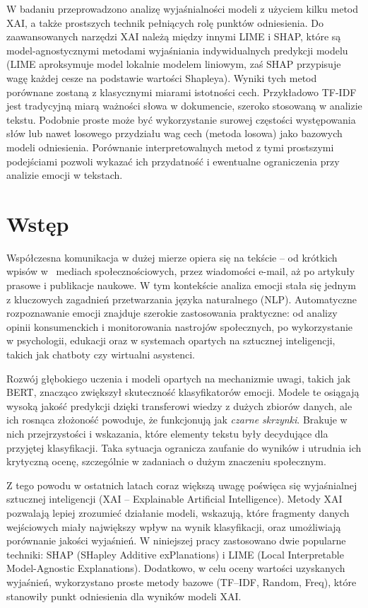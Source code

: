 \documentclass[wmii, inf, mgr]{uwmthesis}
\begin{document}
W badaniu przeprowadzono analizę wyjaśnialności modeli z użyciem kilku metod XAI, a także prostszych technik pełniących rolę punktów odniesienia. Do zaawansowanych narzędzi XAI należą między innymi LIME i SHAP, które są model-agnostycznymi metodami wyjaśniania indywidualnych predykcji modelu (LIME aproksymuje model lokalnie modelem liniowym, zaś SHAP przypisuje wagę każdej cesze na podstawie wartości Shapleya). Wyniki tych metod porównane zostaną z klasycznymi miarami istotności cech. Przykładowo TF-IDF jest tradycyjną miarą ważności słowa w dokumencie, szeroko stosowaną w analizie tekstu. Podobnie proste może być wykorzystanie surowej częstości występowania słów lub nawet losowego przydziału wag cech (metoda losowa) jako bazowych modeli odniesienia. Porównanie interpretowalnych metod z tymi prostszymi podejściami pozwoli wykazać ich przydatność i ewentualne ograniczenia przy analizie emocji w tekstach.


\chapter*{Wstęp}
Współczesna komunikacja w dużej mierze opiera się na tekście -- od krótkich wpisów w~ mediach społecznościowych, przez wiadomości e-mail, aż po artykuły prasowe i publikacje naukowe. W tym kontekście analiza emocji stała się jednym z kluczowych zagadnień przetwarzania języka naturalnego (NLP). Automatyczne rozpoznawanie emocji znajduje szerokie zastosowania praktyczne: od analizy opinii konsumenckich i monitorowania nastrojów społecznych, po wykorzystanie w psychologii, edukacji oraz w systemach opartych na sztucznej inteligencji, takich jak chatboty czy wirtualni asystenci. 

Rozwój głębokiego uczenia i modeli opartych na mechanizmie uwagi, takich jak BERT, znacząco zwiększył skuteczność klasyfikatorów emocji. Modele te osiągają wysoką jakość predykcji dzięki transferowi wiedzy z dużych zbiorów danych, ale ich rosnąca złożoność powoduje, że funkcjonują jak \textit{czarne skrzynki}. Brakuje w nich przejrzystości i wskazania, które elementy tekstu były decydujące dla przyjętej klasyfikacji. Taka sytuacja ogranicza zaufanie do wyników i utrudnia ich krytyczną ocenę, szczególnie w zadaniach o dużym znaczeniu społecznym. 

Z tego powodu w ostatnich latach coraz większą uwagę poświęca się wyjaśnialnej sztucznej inteligencji (XAI -- Explainable Artificial Intelligence). Metody XAI pozwalają lepiej zrozumieć działanie modeli, wskazują, które fragmenty danych wejściowych miały największy wpływ na wynik klasyfikacji, oraz umożliwiają porównanie jakości wyjaśnień. W niniejszej pracy zastosowano dwie popularne techniki: SHAP (SHapley Additive exPlanations) i LIME (Local Interpretable Model-Agnostic Explanations). Dodatkowo, w celu oceny wartości uzyskanych wyjaśnień, wykorzystano proste metody bazowe (TF--IDF, Random, Freq), które stanowiły punkt odniesienia dla wyników modeli XAI. 
\end{document}
